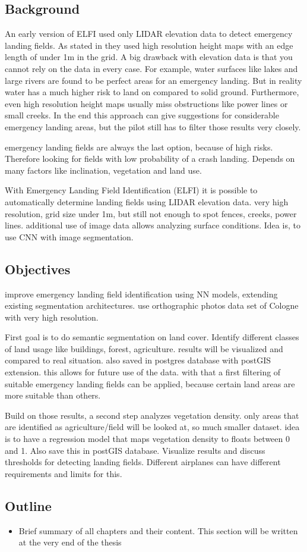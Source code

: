\subsection{Background}
An early version of ELFI used only LIDAR elevation data to detect emergency landing fields. As stated in \cite{feu_elfi} they used high resolution height maps with an edge length of under 1m in the grid. A big drawback with elevation data is that you cannot rely on the data in every case. For example, water surfaces like lakes and large rivers are found to be perfect areas for an emergency landing. But in reality water has a much higher risk to land on compared to solid ground. Furthermore, even high resolution height maps usually miss obstructions like power lines or small creeks. In the end this approach can give suggestions for considerable emergency landing areas, but the pilot still has to filter those results very closely.



\cite{feu_elfi}
emergency landing fields are always the last option, because of high risks. Therefore looking for fields with low probability of a crash landing. Depends on many factors like inclination, vegetation and land use.

With Emergency Landing Field Identification (ELFI) it is possible to automatically determine landing fields using LIDAR elevation data. very high resolution, grid size under 1m, but still not enough to spot fences, creeks, power lines. additional use of image data allows analyzing surface conditions. Idea is, to use CNN with image segmentation.

\subsection{Objectives}
improve emergency landing field identification using NN models, extending existing segmentation architectures. use orthographic photos data set of Cologne with very high resolution.

First goal is to do semantic segmentation on land cover. Identify different classes of land usage like buildings, forest, agriculture. results will be visualized and compared to real situation. also saved in postgres database with postGIS extension. this allows for future use of the data. with that a first filtering of suitable emergency landing fields can be applied, because certain land areas are more suitable than others.

Build on those results, a second step analyzes vegetation density. only areas that are identified as agriculture/field will be looked at, so much smaller dataset. idea is to have a regression model that maps vegetation density to floats between 0 and 1. Also save this in postGIS database. Visualize results and discuss thresholds for detecting landing fields. Different airplanes can have different requirements and limits for this.

\subsection{Outline}

\begin{itemize}
    \item Brief summary of all chapters and their content. This section will be written at the very end of the thesis
\end{itemize}

\newpage